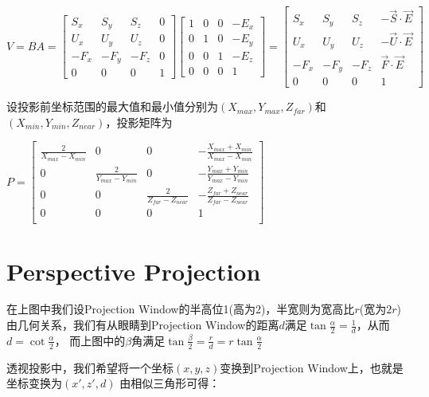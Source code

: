 \documentclass[UTF8]{ctexart}
\begin{document}
$V = BA = \begin{bmatrix} S_x & S_y & S_z & 0 \\
    U_x & U_y & U_z & 0 \\
    -F_x & -F_y & -F_z & 0 \\
    0   &   0 &    0 & 1 

\end{bmatrix} \begin{bmatrix} 1 & 0 & 0 & -E_x \\
    0 & 1 & 0 & -E_y \\
    0 & 0 & 1 & -E_z \\
    0   &   0 &    0 & 1 
\end{bmatrix}
= \begin{bmatrix} S_x & S_y & S_z & -\vec S \cdot \vec E \\
                          U_x & U_y & U_z & -\vec U \cdot \vec E \\
                          -F_x & -F_y & -F_z & \vec F \cdot \vec E \\
                          0 & 0 & 0 & 1
\end{bmatrix}$

\newpage 

设投影前坐标范围的最大值和最小值分别为$(X_{max}, Y_{max}, Z_{far})$和$(X_{min}, Y_{min}, Z_{near})$，投影矩阵为

$P = \begin{bmatrix} 
\frac{2}{X_{max}-X_{min}} & 0 & 0 & -\frac{X_{max}+X_{min}}{X_{max}-X_{min}}\\
0 & \frac{2}{Y_{max}-Y_{min}} & 0 & -\frac{Y_{max}+Y_{min}}{Y_{max}-Y_{min}}\\
0 & 0 & \frac{2}{Z_{far}-Z_{near}} & -\frac{Z_{far}+Z_{near}}{Z_{far}-Z_{near}}\\
0 & 0 & 0 & 1\\ \end{bmatrix}$

\newpage 

\section{Perspective Projection}

在上图中我们设Projection Window的半高位1(高为2)，半宽则为宽高比$r$(宽为$2r$)
由几何关系，我们有从眼睛到Projection Window的距离$d$满足$\tan\frac{\alpha}{2} = \frac{1}{d}$，从而$d = \cot\frac{\alpha}{2}$，
而上图中的$\beta$角满足$\tan\frac{\beta}{2} = \frac{r}{d} = r \tan\frac{\alpha}{2}$

透视投影中，我们希望将一个坐标$(x,y,z)$变换到Projection Window上，也就是坐标变换为$(x', z', d)$
由相似三角形可得：
\end{document}
